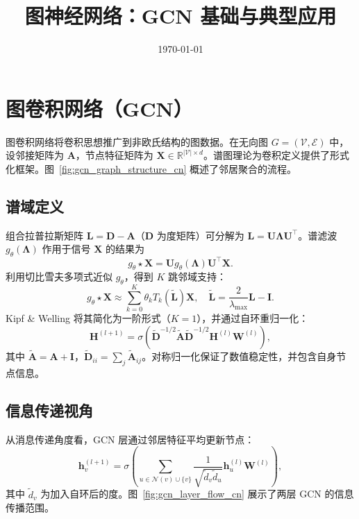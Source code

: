 \documentclass[UTF8,zihao=-4]{ctexart}
\title{图神经网络：GCN 基础与典型应用}
\author{}
\date{\today}
\begin{document}
\maketitle
\tableofcontents
\FloatBarrier

\section{图卷积网络（GCN）}
图卷积网络将卷积思想推广到非欧氏结构的图数据。在无向图 $G = (\mathcal{V}, \mathcal{E})$ 中，设邻接矩阵为 $\mathbf{A}$，节点特征矩阵为 $\mathbf{X} \in \mathbb{R}^{|\mathcal{V}| \times d}$。谱图理论为卷积定义提供了形式化框架。图~\ref{fig:gcn_graph_structure_cn} 概述了邻居聚合的流程。

\subsection{谱域定义}
组合拉普拉斯矩阵 $\mathbf{L} = \mathbf{D} - \mathbf{A}$（$\mathbf{D}$ 为度矩阵）可分解为 $\mathbf{L} = \mathbf{U} \boldsymbol{\Lambda} \mathbf{U}^\top$。谱滤波 $g_\theta(\boldsymbol{\Lambda})$ 作用于信号 $\mathbf{X}$ 的结果为
\begin{equation}
  g_\theta \star \mathbf{X} = \mathbf{U} g_\theta(\boldsymbol{\Lambda}) \mathbf{U}^\top \mathbf{X}.
\end{equation}
利用切比雪夫多项式近似 $g_\theta$，得到 $K$ 跳邻域支持：
\begin{equation}
  g_\theta \star \mathbf{X} \approx \sum_{k=0}^{K} \theta_k T_k(\tilde{\mathbf{L}})\mathbf{X}, \quad \tilde{\mathbf{L}} = \frac{2}{\lambda_{\max}} \mathbf{L} - \mathbf{I}.
\end{equation}
Kipf \& Welling 将其简化为一阶形式（$K=1$），并通过自环重归一化：
\begin{equation}
  \mathbf{H}^{(l+1)} = \sigma\left(\tilde{\mathbf{D}}^{-1/2} \tilde{\mathbf{A}} \tilde{\mathbf{D}}^{-1/2} \mathbf{H}^{(l)} \mathbf{W}^{(l)}\right),
\end{equation}
其中 $\tilde{\mathbf{A}} = \mathbf{A} + \mathbf{I}$，$\tilde{\mathbf{D}}_{ii} = \sum_j \tilde{\mathbf{A}}_{ij}$。对称归一化保证了数值稳定性，并包含自身节点信息。

\subsection{信息传递视角}
从消息传递角度看，GCN 层通过邻居特征平均更新节点：
\begin{equation}
  \mathbf{h}_v^{(l+1)} = \sigma\left(\sum_{u \in \mathcal{N}(v) \cup \{v\}} \frac{1}{\sqrt{\tilde{d}_v \tilde{d}_u}} \mathbf{h}_u^{(l)} \mathbf{W}^{(l)}\right),
\end{equation}
其中 $\tilde{d}_v$ 为加入自环后的度。图~\ref{fig:gcn_layer_flow_cn} 展示了两层 GCN 的信息传播范围。
\end{document}
